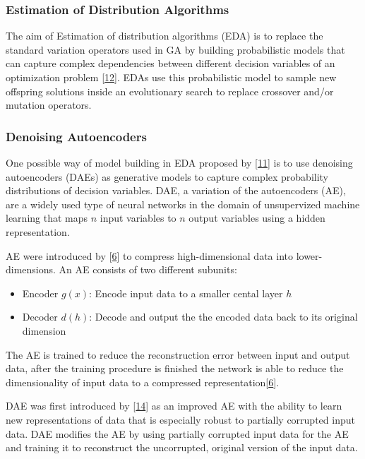 \documentclass[
  11pt,
]{article}
\providecommand{\tightlist}{%
  \setlength{\itemsep}{0pt}\setlength{\parskip}{0pt}}
\begin{document}
\hypertarget{estimation-of-distribution-algorithms}{%
\subsubsection{Estimation of Distribution Algorithms}\label{estimation-of-distribution-algorithms}}

The aim of Estimation of distribution algorithms (EDA) is to replace the standard variation operators used in GA by building probabilistic models that can capture complex dependencies between different decision variables of an optimization problem {[}\protect\hyperlink{ref-design_of_modern_heuristics}{12}{]}.
EDAs use this probabilistic model to sample new offspring solutions inside an evolutionary search to replace crossover and/or mutation operators.

\hypertarget{denoising-autoencoders}{%
\subsubsection{Denoising Autoencoders}\label{denoising-autoencoders}}

One possible way of model building in EDA proposed by {[}\protect\hyperlink{ref-harmless_overfitting_eda}{11}{]} is to use denoising autoencoders (DAEs) as generative models to capture complex probability distributions of decision variables.
DAE, a variation of the autoencoders (AE), are a widely used type of neural networks in the domain of unsupervized machine learning that maps \(n\) input variables to \(n\) output variables using a hidden representation.

AE were introduced by {[}\protect\hyperlink{ref-ae_orig}{6}{]} to compress high-dimensional data into lower-dimensions. An AE consists of two different subunits:

\begin{itemize}
\tightlist
\item
  Encoder \(g(x)\): Encode input data to a smaller cental layer \(h\)
\item
  Decoder \(d(h)\): Decode and output the the encoded data back to its original dimension
\end{itemize}

The AE is trained to reduce the reconstruction error between input and output data, after the training procedure is finished the network is able to reduce the dimensionality of input data to a compressed representation{[}\protect\hyperlink{ref-ae_orig}{6}{]}.

DAE was first introduced by {[}\protect\hyperlink{ref-dae_orig2008}{14}{]} as an improved AE with the ability to learn new representations of data that is especially robust to partially corrupted input data. DAE modifies the AE by using partially corrupted input data for the AE and training it to reconstruct the uncorrupted, original version of the input data.
\end{document}
